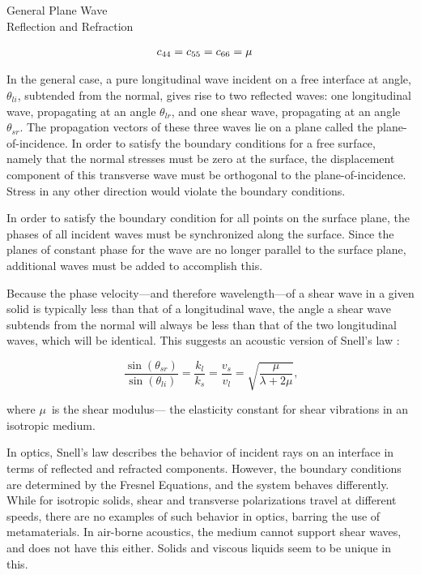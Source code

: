 \documentclass[a4paper,10pt]{report}
\numberwithin{equation}{section}
\begin{document}
{\begin{chapter}
\begin{section}{General Plane Wave \\Reflection and Refraction}
\begin{singlespace}
\begin{align}
c_{44} = c_{55} = c_{66} &= \mu\notag
\end{align}
\end{singlespace}
\par
In the general case, a pure longitudinal wave incident on a free interface at angle, $\theta_{li}$, subtended from the normal, gives rise to two reflected waves: one longitudinal wave, propagating at an angle $\theta_{lr}$, and one shear wave, propagating at an angle $\theta_{sr}$. The propagation vectors of these three waves lie on a plane called the plane-of-incidence. In order to satisfy the boundary conditions for a free surface, namely that the normal stresses must be zero at the surface, the displacement component of this transverse wave must be orthogonal to the plane-of-incidence. Stress in any other direction would violate the boundary conditions. 
\par
In order to satisfy the boundary condition for all points on the surface plane, the phases of all incident waves must be synchronized along the surface. Since the planes of constant phase for the wave are no longer parallel to the surface plane, additional waves must be added to accomplish this.
\par
Because the phase velocity---and therefore wavelength---of a shear wave in a given solid is typically less than that of a longitudinal wave, the angle a shear wave subtends from the normal will always be less than that of the two longitudinal waves, which will be identical. This suggests an acoustic version of Snell's law\cite[p.~96]{Kino1987} \cite[p.~141]{Cremer1973}:
\par
\begin{equation}
\frac{\sin(\theta_{sr})}{\sin(\theta_{li})} = \frac{k_l}{k_s} = \frac{v_s}{v_l} = \sqrt{\frac{\mu}{\lambda + 2\mu}} \text{,}
\end{equation}
\par
where $\mu$\  is the shear modulus--- the elasticity constant for shear vibrations in an isotropic medium. 
\par
In optics, Snell's law describes the behavior of incident rays on an interface in terms of reflected and refracted components. However, the boundary conditions are determined by the Fresnel Equations, and the system behaves differently. While for isotropic solids, shear and transverse polarizations travel at different speeds, there are no examples of such behavior in optics, barring the use of metamaterials. In air-borne acoustics, the medium cannot support shear waves, and does not have this either. Solids and viscous liquids seem to be unique in this.

\end{section}
\end{chapter}}
\end{document}
